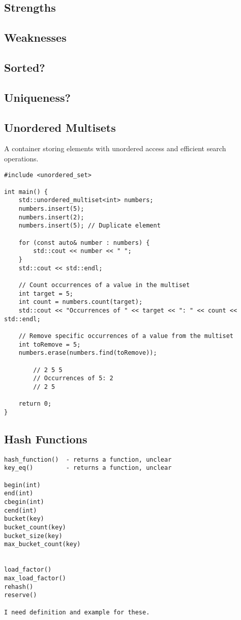 \subsection{Strengths}
\subsection{Weaknesses}
\subsection{Sorted?}
\subsection{Uniqueness?}

\subsection{Unordered Multisets}

A container storing elements with unordered access and efficient search operations.

\begin{verbatim}
#include <unordered_set>

int main() {
    std::unordered_multiset<int> numbers;
    numbers.insert(5);
    numbers.insert(2);
    numbers.insert(5); // Duplicate element

    for (const auto& number : numbers) {
        std::cout << number << " ";
    }
    std::cout << std::endl;

    // Count occurrences of a value in the multiset
    int target = 5;
    int count = numbers.count(target);
    std::cout << "Occurrences of " << target << ": " << count << std::endl;

    // Remove specific occurrences of a value from the multiset
    int toRemove = 5;
    numbers.erase(numbers.find(toRemove));
    
        // 2 5 5
        // Occurrences of 5: 2
        // 2 5

    return 0;
}
\end{verbatim}

\subsection{Hash Functions}

\begin{verbatim}
hash_function()  - returns a function, unclear
key_eq()         - returns a function, unclear 

begin(int)
end(int)
cbegin(int)
cend(int)
bucket(key)
bucket_count(key)
bucket_size(key)
max_bucket_count(key)


load_factor()
max_load_factor()
rehash()
reserve()

I need definition and example for these.
\end{verbatim}

